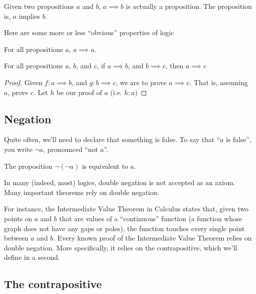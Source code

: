 \begin{remark}
  Given two propositions $a$ and $b$, $a \implies b$ is actually a
  proposition. The proposition is, $a$ implies $b$.
\end{remark}

Here are some more or less ``obvious'' properties of logic

\begin{axiom}
  \label{ax:props-refl}
  For all propositions $a$, $a \implies a$.
\end{axiom}

\begin{lemma}
  \label{ax:props-trans}
  For all propositions $a$, $b$, and $c$, if $a \implies b$, and $b
  \implies c$, then $a \implies c$
\end{lemma}

\begin{proof}
  Given $f : a \implies b$, and $g : b \implies c$, we are to prove $a
  \implies c$. That is, assuming $a$, prove $c$. Let $h$ be our proof
  of $a$ (i.e. $h : a$)
\end{proof}

\subsection{Negation}

Quite often, we'll need to declare that something is false. To say
that ``$a$ is false'', you write $\lnot a$, pronounced ``not $a$''.

\begin{axiom}
  The proposition $\lnot(\lnot a)$ is equivalent to $a$.
\end{axiom}

\begin{remark}
  In many (indeed, most) logics, double negation is not accepted as an
  axiom. Many important theorems rely on double negation.

  For instance, the Intermediate Value Theorem in Calculus states
  that, given two points on $a$ and $b$ that are values of a
  ``continuous'' function (a function whose graph does not have any
  gaps or poles), the function touches every single point between $a$
  and $b$. Every known proof of the Intermediate Value Theorem relies
  on double negation. More specifically, it relies on the
  contrapositive, which we'll define in a second.
\end{remark}

\subsection{The contrapositive}

